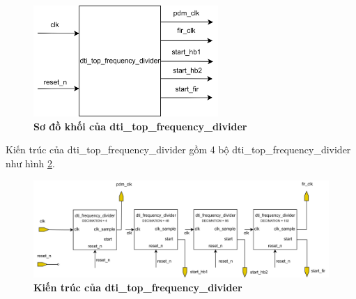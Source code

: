 \begin{figure}[H]
    \centering
    \includegraphics[width=7cm]{Images/Chuong4/frequency/top_frequency.png}
    \caption[Sơ đồ khối của dti\_top\_frequency\_divider]{\bfseries \fontsize{12pt}{0pt}\selectfont Sơ đồ khối của dti\_top\_frequency\_divider}
    \label{top_frequency}
\end{figure}
Kiến trúc của dti\_top\_frequency\_divider gồm 4 bộ dti\_top\_frequency\_divider như hình \ref{top_frequency_arc}.
\begin{figure}[H]
    \centering
    \includegraphics[width=15cm]{Images/Chuong4/frequency/top_frequency_arc.png}
    \caption[Kiến trúc của dti\_top\_frequency\_divider]{\bfseries \fontsize{12pt}{0pt}\selectfont Kiến trúc của dti\_top\_frequency\_divider}
    \label{top_frequency_arc}
\end{figure}


